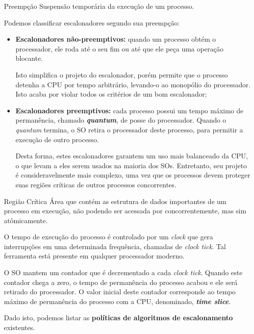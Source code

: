 \begin{definicao}{Preempção}
  Suspensão temporária da execução de um processo.
\end{definicao}

Podemos classificar escalonadores segundo sua preempção:

\begin{itemize}
  \item \textbf{Escalonadores não-preemptivos:} quando um processo obtém o processador, ele roda até o seu fim ou até que ele peça uma operação blocante.

  Isto simplifica o projeto do escalonador, porém permite que o processo detenha a CPU por tempo arbitrário, levando-o ao monopólio do processador. Isto acaba por violar todos os critérios de um bom escalonador;

  \item \textbf{Escalonadores preemptivos:} cada processo possui um tempo máximo de permanência, chamado \textbf{\textit{quantum}}, de posse do processador. Quando o \textit{quantum} termina, o SO retira o processador deste processo, para permitir a execução de outro processo.

  Desta forma, estes escalonadores garantem um uso mais balanceado da CPU, o que levam a eles serem usados na maioria dos SOs. Entretanto, seu projeto é consideravelmente mais complexo, uma vez que os processos devem proteger suas regiões críticas de outros processos concorrentes.
\end{itemize}

\begin{definicao}{Região Crítica}
  Área que contém as estrutura de dados importantes de um processo em execução, não podendo ser acessada por concorrentemente, mas sim atômicamente.
\end{definicao}

O tempo de execução do processo é controlado por um \textit{clock} que gera interrupções em uma determinada frequência, chamadas de \textit{clock tick}. Tal ferramenta está presente em qualquer processador moderno.

O SO mantem um contador que é decrementado a cada \textit{clock tick}. Quando este contador chega a zero, o tempo de permanência do processo acabou e ele será retirado do processador. O valor inicial deste contador corresponde ao tempo máximo de permanência do processo com a CPU, denominado, \textbf{\textit{time slice}}.

Dado isto, podemos listar as \textbf{políticas de algoritmos de escalonamento} existentes.



